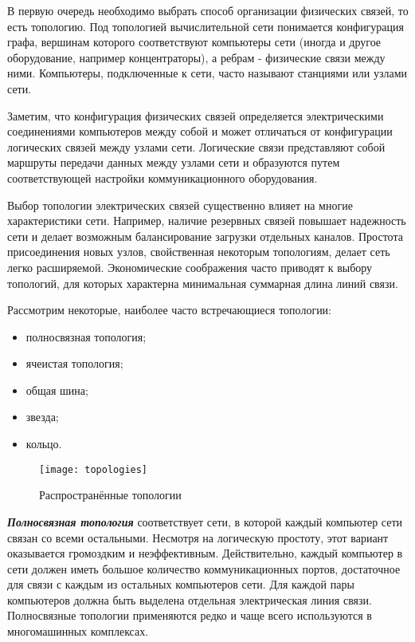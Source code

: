 В первую очередь необходимо выбрать способ организации физических связей, то есть топологию.
Под топологией вычислительной сети понимается конфигурация графа, вершинам которого соответствуют компьютеры сети (иногда и другое оборудование, например концентраторы), а ребрам - физические связи между ними.
Компьютеры, подключенные к сети, часто называют станциями или узлами сети.

Заметим, что конфигурация физических связей определяется электрическими соединениями компьютеров между собой и может отличаться от конфигурации логических связей между узлами сети.
Логические связи представляют собой маршруты передачи данных между узлами сети и образуются путем соответствующей настройки коммуникационного оборудования.

Выбор топологии электрических связей существенно влияет на многие характеристики сети.
Например, наличие резервных связей повышает надежность сети и делает возможным балансирование загрузки отдельных каналов.
Простота присоединения новых узлов, свойственная некоторым топологиям, делает сеть легко расширяемой.
Экономические соображения часто приводят к выбору топологий, для которых характерна минимальная суммарная длина линий связи.

Рассмотрим некоторые, наиболее часто встречающиеся топологии:
\begin{itemize}
    \item полносвязная топология;
    \item ячеистая топология;
    \item общая шина;
    \item звезда;
    \item кольцо.
\end{itemize}

\begin{figure}[!ht]
    \centering
    \texttt{[image: topologies]}
    \caption{Распространённые топологии}
    \label{fig:topologies}
\end{figure}

\textbf{\textit{Полносвязная топология}} соответствует сети, в которой каждый компьютер сети связан со всеми остальными.
Несмотря на логическую простоту, этот вариант оказывается громоздким и неэффективным.
Действительно, каждый компьютер в сети должен иметь большое количество коммуникационных портов, достаточное для связи с каждым из остальных компьютеров сети.
Для каждой пары компьютеров должна быть выделена отдельная электрическая линия связи.
Полносвязные топологии применяются редко и чаще всего используются в многомашинных комплексах.

